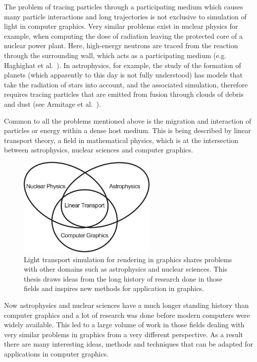 The problem of tracing particles through a participating medium which causes many particle interactions and long trajectories is not exclusive to simulation of light in computer graphics. Very similar problems exist in nuclear physics for example, when computing the dose of radiation leaving the protected core of a nuclear power plant. Here, high-energy neutrons are traced from the reaction through the surrounding wall, which acts as a participating medium (e.g. Haghighat et al.~\cite{Haghighat03}). In astrophysics, for example, the study of the formation of planets (which apparently to this day is not fully understood) has models that take the radiation of stars into account, and the associated simulation, therefore requires tracing particles that are emitted from fusion through clouds of debris and dust (see Armitage et al.~\cite{Armitage11}).

Common to all the problems mentioned above is the migration and interaction of particles or energy within a dense host medium. This is being described by linear transport theory, a field in mathematical physics, which is at the intersection between astrophysics, nuclear sciences and computer graphics.
\begin{figure}[ht]
\centering
\includegraphics[width=0.6\textwidth]{02_Introduction/figures/fig_linear_transport.pdf}
\caption{Light transport simulation for rendering in graphics shares problems with other domains such as astrophysics and nuclear sciences. This thesis draws ideas from the long history of research done in those fields and inspires new methods for application in graphics.}
\label{fig:intro_linear_transport_fields}
\end{figure}

Now astrophysics and nuclear sciences have a much longer standing history than computer graphics and a lot of research was done before modern computers were widely available. This led to a large volume of work in those fields dealing with very similar problems in graphics from a very different perspective. As a result there are many interesting ideas, methods and techniques that can be adapted for applications in computer graphics.

